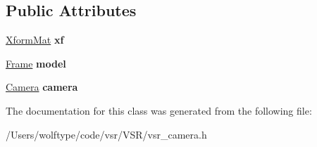 \subsection*{Public Attributes}
\begin{DoxyCompactItemize}
\item 
\hypertarget{classvsr_1_1_scene_a6ee0e665ba7e8efbee653219d55e65d9}{\hyperlink{structvsr_1_1_xform_mat}{Xform\-Mat} {\bfseries xf}}\label{classvsr_1_1_scene_a6ee0e665ba7e8efbee653219d55e65d9}

\item 
\hypertarget{classvsr_1_1_scene_a9645a0781e5bde8a5737ada45ca82f1f}{\hyperlink{classvsr_1_1_frame}{Frame} {\bfseries model}}\label{classvsr_1_1_scene_a9645a0781e5bde8a5737ada45ca82f1f}

\item 
\hypertarget{classvsr_1_1_scene_a26e96796f6038317cbb682284f5a5f39}{\hyperlink{classvsr_1_1_camera}{Camera} {\bfseries camera}}\label{classvsr_1_1_scene_a26e96796f6038317cbb682284f5a5f39}

\end{DoxyCompactItemize}


The documentation for this class was generated from the following file\-:\begin{DoxyCompactItemize}
\item 
/\-Users/wolftype/code/vsr/\-V\-S\-R/vsr\-\_\-camera.\-h\end{DoxyCompactItemize}
